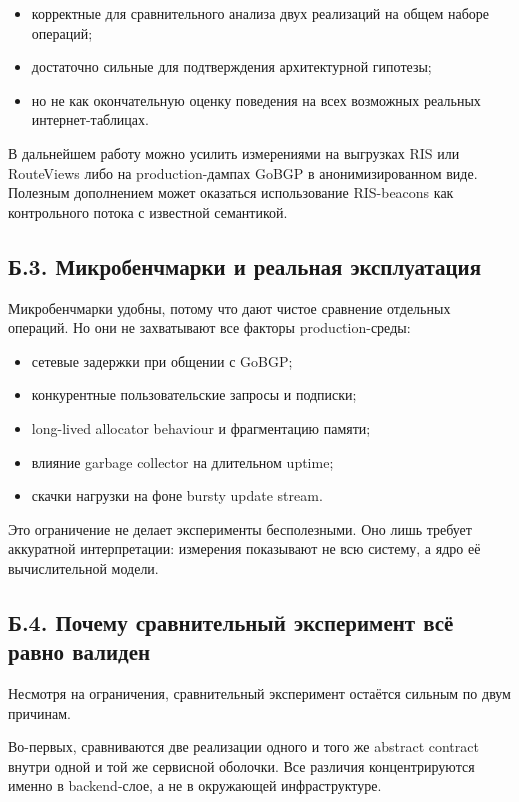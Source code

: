 \begin{itemize}
\item корректные для сравнительного анализа двух реализаций на общем
наборе операций;
\item достаточно сильные для подтверждения архитектурной гипотезы;
\item но не как окончательную оценку поведения на всех возможных
реальных интернет-таблицах.
\end{itemize}

В дальнейшем работу можно усилить измерениями на выгрузках RIS
\cite{ripe-ris} или RouteViews \cite{routeviews} либо на
production-дампах GoBGP в анонимизированном виде. Полезным
дополнением может оказаться использование RIS-beacons
\cite{ripe-beacons} как контрольного потока с известной семантикой.

\subsection*{Б.3. Микробенчмарки и реальная эксплуатация}

Микробенчмарки удобны, потому что дают чистое сравнение отдельных
операций. Но они не захватывают все факторы production-среды:

\begin{itemize}
\item сетевые задержки при общении с GoBGP;
\item конкурентные пользовательские запросы и подписки;
\item long-lived allocator behaviour и фрагментацию памяти;
\item влияние garbage collector на длительном uptime;
\item скачки нагрузки на фоне bursty update stream.
\end{itemize}

Это ограничение не делает эксперименты бесполезными. Оно лишь требует
аккуратной интерпретации: измерения показывают не всю систему, а ядро
её вычислительной модели.

\subsection*{Б.4. Почему сравнительный эксперимент всё равно валиден}

Несмотря на ограничения, сравнительный эксперимент остаётся сильным
по двум причинам.

Во-первых, сравниваются две реализации одного и того же abstract
contract внутри одной и той же сервисной оболочки. Все различия
концентрируются именно в backend-слое, а не в окружающей инфраструктуре.

